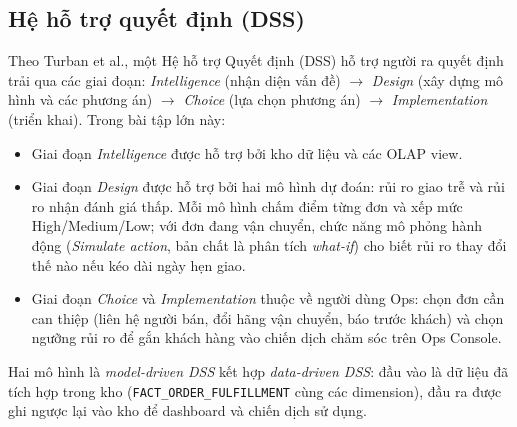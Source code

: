 \subsection{Hệ hỗ trợ quyết định (DSS)}\label{sec:dss}

\hspace{1cm}
Theo Turban et al., một Hệ hỗ trợ Quyết định (DSS) hỗ trợ người ra quyết định trải qua các
giai đoạn: \textit{Intelligence} (nhận diện vấn đề) $\to$ \textit{Design} (xây dựng mô hình
và các phương án) $\to$ \textit{Choice} (lựa chọn phương án) $\to$ \textit{Implementation}
(triển khai). Trong bài tập lớn này:
\begin{itemize}
    \item Giai đoạn \textit{Intelligence} được hỗ trợ bởi kho dữ liệu và các OLAP view.
    \item Giai đoạn \textit{Design} được hỗ trợ bởi hai mô hình dự đoán: rủi ro giao trễ và rủi
          ro nhận đánh giá thấp. Mỗi mô hình chấm điểm từng đơn và xếp mức High/Medium/Low; với đơn
          đang vận chuyển, chức năng mô phỏng hành động (\textit{Simulate action}, bản chất là phân tích
          \textit{what-if}) cho biết rủi ro thay đổi thế nào nếu kéo dài ngày hẹn giao.
    \item Giai đoạn \textit{Choice} và \textit{Implementation} thuộc về người dùng Ops: chọn
          đơn cần can thiệp (liên hệ người bán, đổi hãng vận chuyển, báo trước khách) và chọn
          ngưỡng rủi ro để gắn khách hàng vào chiến dịch chăm sóc trên Ops Console.
\end{itemize}
Hai mô hình là \textit{model-driven DSS} kết hợp \textit{data-driven DSS}: đầu vào là dữ liệu
đã tích hợp trong kho (\texttt{FACT\_ORDER\_FULFILLMENT} cùng các dimension), đầu ra được ghi
ngược lại vào kho để dashboard và chiến dịch sử dụng.

